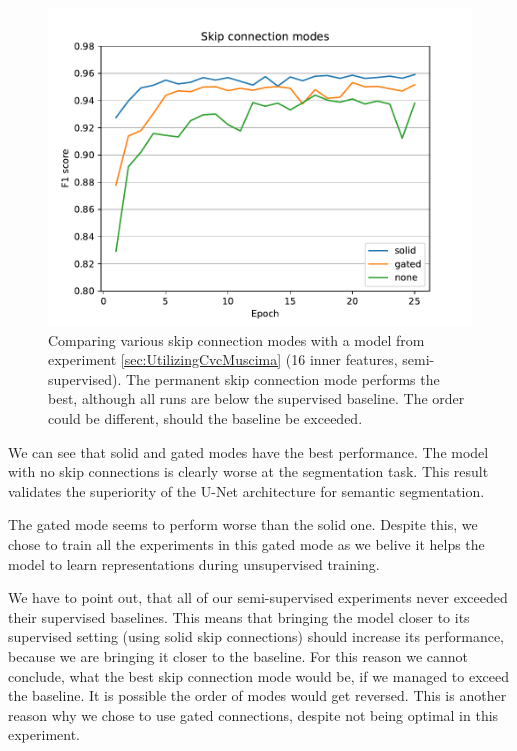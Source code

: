 \begin{figure}[ht]
    \centering
    \includegraphics[width=140mm]{../../figures/05-skip-connections/skip.pdf}
    \caption{Comparing various skip connection modes with a model from experiment \ref{sec:UtilizingCvcMuscima} (16 inner features, semi-supervised). The permanent skip connection mode performs the best, although all runs are below the supervised baseline. The order could be different, should the baseline be exceeded.}
    \label{fig:SkipConnections}
\end{figure}

We can see that solid and gated modes have the best performance. The model with no skip connections is clearly worse at the segmentation task. This result validates the superiority of the U-Net architecture for semantic segmentation.

The gated mode seems to perform worse than the solid one. Despite this, we chose to train all the experiments in this gated mode as we belive it helps the model to learn representations during unsupervised training.

We have to point out, that all of our semi-supervised experiments never exceeded their supervised baselines. This means that bringing the model closer to its supervised setting (using solid skip connections) should increase its performance, because we are bringing it closer to the baseline. For this reason we cannot conclude, what the best skip connection mode would be, if we managed to exceed the baseline. It is possible the order of modes would get reversed. This is another reason why we chose to use gated connections, despite not being optimal in this experiment.


